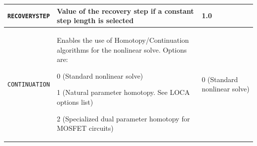 \begin{longtable}[htbp]{|>{\setlength{\hsize}{.8\hsize}}Y|
>{\setlength{\hsize}{1.5\hsize}}Y|
>{\setlength{\hsize}{.7\hsize}}Y|}
\texttt{RECOVERYSTEP} & Value of the recovery step if a constant step length is selected & 1.0 \\ \hline

\texttt{CONTINUATION} & Enables the use of Homotopy/Continuation algorithms for the nonlinear solve.  Options are:
\begin{XyceItemize}
\item 0 (Standard nonlinear solve)
\item 1 (Natural parameter homotopy.  See LOCA options list)
\item 2 (Specialized dual parameter homotopy for MOSFET circuits)
\end{XyceItemize} & 0 (Standard nonlinear solve) \\ \hline


\end{longtable}
